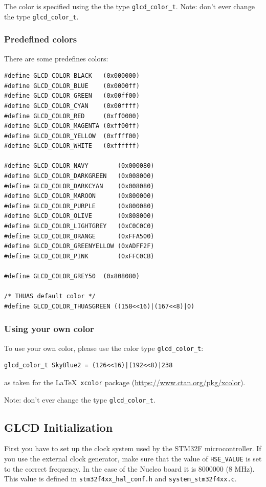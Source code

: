 \documentclass[12pt]{article}
\begin{document}
The color is specified using the the type \lstinline|glcd_color_t|. Note: don't ever change the type \lstinline|glcd_color_t|.

\subsubsection{Predefined colors}
There are some predefines colors:

\begin{lstlisting}
#define GLCD_COLOR_BLACK   (0x000000)
#define GLCD_COLOR_BLUE    (0x0000ff)
#define GLCD_COLOR_GREEN   (0x00ff00)
#define GLCD_COLOR_CYAN    (0x00ffff)
#define GLCD_COLOR_RED     (0xff0000)
#define GLCD_COLOR_MAGENTA (0xff00ff)
#define GLCD_COLOR_YELLOW  (0xffff00)
#define GLCD_COLOR_WHITE   (0xffffff)

#define GLCD_COLOR_NAVY        (0x000080)
#define GLCD_COLOR_DARKGREEN   (0x008000)
#define GLCD_COLOR_DARKCYAN    (0x008080)
#define GLCD_COLOR_MAROON      (0x800000)
#define GLCD_COLOR_PURPLE      (0x800080)
#define GLCD_COLOR_OLIVE       (0x808000)
#define GLCD_COLOR_LIGHTGREY   (0xC0C0C0)
#define GLCD_COLOR_ORANGE      (0xFFA500)
#define GLCD_COLOR_GREENYELLOW (0xADFF2F)
#define GLCD_COLOR_PINK        (0xFFC0CB)

#define GLCD_COLOR_GREY50  (0x808080)

/* THUAS default color */
#define GLCD_COLOR_THUASGREEN ((158<<16)|(167<<8)|0)
\end{lstlisting}

\subsubsection{Using your own color}
To use your own color, please use the color type \lstinline|glcd_color_t|:

\begin{lstlisting}
glcd_color_t SkyBlue2 = (126<<16)|(192<<8)|238
\end{lstlisting}

as taken for the \LaTeX\ \lstinline|xcolor| package (\url{https://www.ctan.org/pkg/xcolor}).

Note: don't ever change the type \lstinline|glcd_color_t|.

\subsection{GLCD Initialization}
First you have to set up the clock system used by the STM32F microcontroller. If you use the external clock generator, make sure that the value of \lstinline|HSE_VALUE| is set to the correct frequency. In the case of the Nucleo board it is 8000000 (8 MHz). This value is defined in \lstinline|stm32f4xx_hal_conf.h| and \lstinline|system_stm32f4xx.c|.
\end{document}
